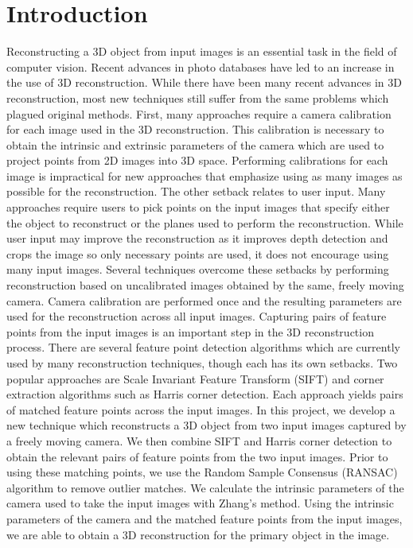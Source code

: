 \section{Introduction}
\label{s:intro}

Reconstructing a 3D object from input images is an essential task in the field of computer vision. Recent advances in photo databases have led to an increase in the use of 3D reconstruction. While there have been many recent advances in 3D reconstruction, most new techniques still suffer from the same problems which plagued original methods. 
First, many approaches require a camera calibration for each image used in the 3D reconstruction. This calibration is necessary to obtain the intrinsic and extrinsic parameters of the camera which are used to project points from 2D images into 3D space. Performing calibrations for each image is impractical for new approaches that emphasize using as many images as possible for the reconstruction.
The other setback relates to user input. Many approaches require users to pick points on the input images that specify either the object to reconstruct or the planes used to perform the reconstruction. While user input may improve the reconstruction as it improves depth detection and crops the image so only necessary points are used, it does not encourage using many input images. Several techniques overcome these setbacks by performing reconstruction based on uncalibrated images obtained by the same, freely moving camera. Camera calibration are performed once and the resulting parameters are used for the reconstruction across all input images. 
Capturing pairs of feature points from the input images is an important step in the 3D reconstruction process. There are several feature point detection algorithms which are currently used by many reconstruction techniques, though each has its own setbacks. Two popular approaches are Scale Invariant Feature Transform (SIFT) and corner extraction algorithms such as Harris corner detection. Each approach yields pairs of matched feature points across the input images. 
In this project, we develop a new technique which reconstructs a 3D object from two input images captured by a freely moving camera. We then combine SIFT and Harris corner detection to obtain the relevant pairs of feature points from the two input images. Prior to using these matching points, we use the Random Sample Consensus (RANSAC) algorithm to remove outlier matches. We calculate the intrinsic parameters of the camera used to take the input images with Zhang’s method. Using the intrinsic parameters of the camera and the matched feature points from the input images, we are able to obtain a 3D reconstruction for the primary object in the image. 
